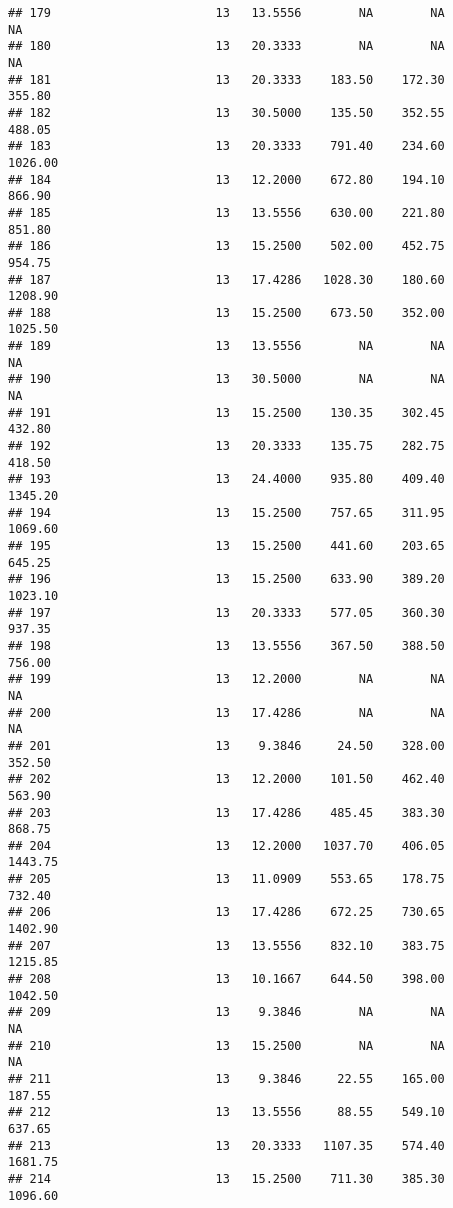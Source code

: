 \documentclass[]{article}
\begin{document}
\begin{verbatim}
## 179                       13   13.5556        NA        NA         NA
## 180                       13   20.3333        NA        NA         NA
## 181                       13   20.3333    183.50    172.30     355.80
## 182                       13   30.5000    135.50    352.55     488.05
## 183                       13   20.3333    791.40    234.60    1026.00
## 184                       13   12.2000    672.80    194.10     866.90
## 185                       13   13.5556    630.00    221.80     851.80
## 186                       13   15.2500    502.00    452.75     954.75
## 187                       13   17.4286   1028.30    180.60    1208.90
## 188                       13   15.2500    673.50    352.00    1025.50
## 189                       13   13.5556        NA        NA         NA
## 190                       13   30.5000        NA        NA         NA
## 191                       13   15.2500    130.35    302.45     432.80
## 192                       13   20.3333    135.75    282.75     418.50
## 193                       13   24.4000    935.80    409.40    1345.20
## 194                       13   15.2500    757.65    311.95    1069.60
## 195                       13   15.2500    441.60    203.65     645.25
## 196                       13   15.2500    633.90    389.20    1023.10
## 197                       13   20.3333    577.05    360.30     937.35
## 198                       13   13.5556    367.50    388.50     756.00
## 199                       13   12.2000        NA        NA         NA
## 200                       13   17.4286        NA        NA         NA
## 201                       13    9.3846     24.50    328.00     352.50
## 202                       13   12.2000    101.50    462.40     563.90
## 203                       13   17.4286    485.45    383.30     868.75
## 204                       13   12.2000   1037.70    406.05    1443.75
## 205                       13   11.0909    553.65    178.75     732.40
## 206                       13   17.4286    672.25    730.65    1402.90
## 207                       13   13.5556    832.10    383.75    1215.85
## 208                       13   10.1667    644.50    398.00    1042.50
## 209                       13    9.3846        NA        NA         NA
## 210                       13   15.2500        NA        NA         NA
## 211                       13    9.3846     22.55    165.00     187.55
## 212                       13   13.5556     88.55    549.10     637.65
## 213                       13   20.3333   1107.35    574.40    1681.75
## 214                       13   15.2500    711.30    385.30    1096.60

\end{verbatim}
\end{document}
